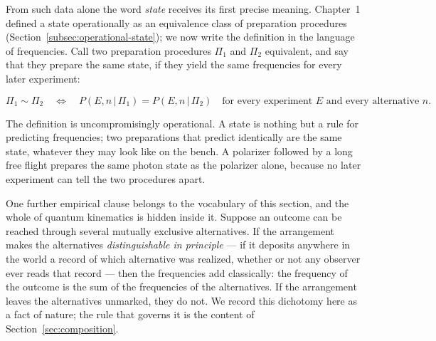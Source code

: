 From such data alone the word \emph{state} receives its first precise meaning. Chapter~1 defined a state operationally as an equivalence class of preparation procedures (Section~\ref{subsec:operational-state}); we now write the definition in the language of frequencies. Call two preparation procedures $\Pi_1$ and $\Pi_2$ equivalent, and say that they prepare the same state, if they yield the same frequencies for every later experiment:
\begin{linenomath}
\begin{equation}
    \Pi_1 \sim \Pi_2
    \quad\Longleftrightarrow\quad
    P(E,n\,|\,\Pi_1) = P(E,n\,|\,\Pi_2)
    \quad\text{for every experiment } E \text{ and every alternative } n .
\end{equation}
\end{linenomath}
The definition is uncompromisingly operational. A state is nothing but a rule for predicting frequencies; two preparations that predict identically are the same state, whatever they may look like on the bench. A polarizer followed by a long free flight prepares the same photon state as the polarizer alone, because no later experiment can tell the two procedures apart.

One further empirical clause belongs to the vocabulary of this section, and the whole of quantum kinematics is hidden inside it. Suppose an outcome can be reached through several mutually exclusive alternatives. If the arrangement makes the alternatives \emph{distinguishable in principle} --- if it deposits anywhere in the world a record of which alternative was realized, whether or not any observer ever reads that record --- then the frequencies add classically: the frequency of the outcome is the sum of the frequencies of the alternatives. If the arrangement leaves the alternatives unmarked, they do not. We record this dichotomy here as a fact of nature; the rule that governs it is the content of Section~\ref{sec:composition}.

